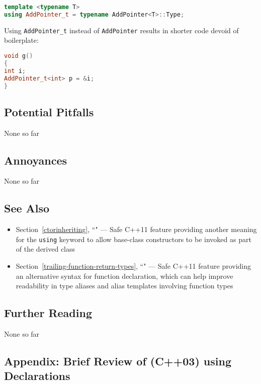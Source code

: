 \begin{lstlisting}[language=C++]
template <typename T>
using AddPointer_t = typename AddPointer<T>::Type;
\end{lstlisting}

\noindent Using \texttt{AddPointer\_t} instead of \texttt{AddPointer} results in
shorter code devoid of boilerplate:

\begin{lstlisting}[language=C++]
void g()
{
int i;
AddPointer_t<int> p = &i;
}
\end{lstlisting}


\subsection[Potential Pitfalls]{Potential Pitfalls}\label{potential-pitfalls}

None so far

\subsection[Annoyances]{Annoyances}\label{annoyances}

None so far

\subsection[See Also]{See Also}\label{see-also}

\begin{itemize}
\item{Section~\ref{ctorinheriting}, ``" — Safe C++11 feature providing another meaning for the \texttt{using} keyword to allow base-class constructors to be invoked as part of the derived class}
\item{Section~\ref{trailing-function-return-types}, ``" — Safe C++11 feature providing an alternative syntax for function declaration, which can help improve readability in type aliases and alias templates involving function types}
\end{itemize}

\subsection[Further Reading]{Further Reading}\label{further-reading}

None so far

\subsection[Appendix: Brief Review of (C++03) {\tt using} Declarations]{Appendix: Brief Review of (C++03) {\SubsecCode using} Declarations}\label{appendix:-brief-review-of-(c++03)-using-declarations}

